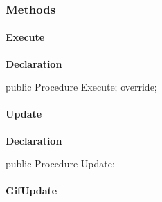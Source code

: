 \documentclass{report}
\newif\ifpdf
\begin{document}
\subsubsection*{\large{\textbf{Methods}}\normalsize\hspace{1ex}\hfill}
\paragraph*{Execute}\hspace*{\fill}

\label{gifanimator.TGifThread-Execute}
\begin{list}{}{
\setlength{\itemindent}{0cm}
\setlength{\listparindent}{0cm}
\setlength{\leftmargin}{\evensidemargin}
\addtolength{\leftmargin}{\tmplength}
\settowidth{\labelsep}{X}
\addtolength{\leftmargin}{\labelsep}
\setlength{\labelwidth}{\tmplength}
}
\item[\textbf{Declaration}\hfill]
\ifpdf
\begin{flushleft}
\fi
\begin{ttfamily}
public Procedure Execute; override;\end{ttfamily}

\ifpdf
\end{flushleft}
\fi

\end{list}
\paragraph*{Update}\hspace*{\fill}

\label{gifanimator.TGifThread-Update}
\begin{list}{}{
\setlength{\itemindent}{0cm}
\setlength{\listparindent}{0cm}
\setlength{\leftmargin}{\evensidemargin}
\addtolength{\leftmargin}{\tmplength}
\settowidth{\labelsep}{X}
\addtolength{\leftmargin}{\labelsep}
\setlength{\labelwidth}{\tmplength}
}
\item[\textbf{Declaration}\hfill]
\ifpdf
\begin{flushleft}
\fi
\begin{ttfamily}
public Procedure Update;\end{ttfamily}

\ifpdf
\end{flushleft}
\fi

\end{list}
\paragraph*{GifUpdate}\hspace*{\fill}
\end{document}
